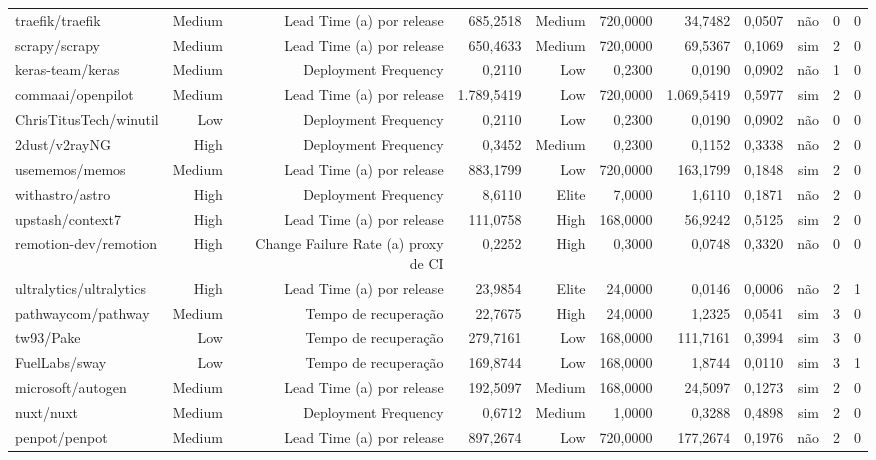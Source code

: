 \begin{tabular}{lrrrrrrrrrr}
traefik/traefik & Medium & Lead Time (a) por release & 685,2518 & Medium & 720,0000 & 34,7482 & 0,0507 & não & 0 & 0 \\
scrapy/scrapy & Medium & Lead Time (a) por release & 650,4633 & Medium & 720,0000 & 69,5367 & 0,1069 & sim & 2 & 0 \\
keras-team/keras & Medium & Deployment Frequency & 0,2110 & Low & 0,2300 & 0,0190 & 0,0902 & não & 1 & 0 \\
commaai/openpilot & Medium & Lead Time (a) por release & 1.789,5419 & Low & 720,0000 & 1.069,5419 & 0,5977 & sim & 2 & 0 \\
ChrisTitusTech/winutil & Low & Deployment Frequency & 0,2110 & Low & 0,2300 & 0,0190 & 0,0902 & não & 0 & 0 \\
2dust/v2rayNG & High & Deployment Frequency & 0,3452 & Medium & 0,2300 & 0,1152 & 0,3338 & não & 2 & 0 \\
usememos/memos & Medium & Lead Time (a) por release & 883,1799 & Low & 720,0000 & 163,1799 & 0,1848 & sim & 2 & 0 \\
withastro/astro & High & Deployment Frequency & 8,6110 & Elite & 7,0000 & 1,6110 & 0,1871 & não & 2 & 0 \\
upstash/context7 & High & Lead Time (a) por release & 111,0758 & High & 168,0000 & 56,9242 & 0,5125 & sim & 2 & 0 \\
remotion-dev/remotion & High & Change Failure Rate (a) proxy de CI & 0,2252 & High & 0,3000 & 0,0748 & 0,3320 & não & 0 & 0 \\
ultralytics/ultralytics & High & Lead Time (a) por release & 23,9854 & Elite & 24,0000 & 0,0146 & 0,0006 & não & 2 & 1 \\
pathwaycom/pathway & Medium & Tempo de recuperação & 22,7675 & High & 24,0000 & 1,2325 & 0,0541 & sim & 3 & 0 \\
tw93/Pake & Low & Tempo de recuperação & 279,7161 & Low & 168,0000 & 111,7161 & 0,3994 & sim & 3 & 0 \\
FuelLabs/sway & Low & Tempo de recuperação & 169,8744 & Low & 168,0000 & 1,8744 & 0,0110 & sim & 3 & 1 \\
microsoft/autogen & Medium & Lead Time (a) por release & 192,5097 & Medium & 168,0000 & 24,5097 & 0,1273 & sim & 2 & 0 \\
nuxt/nuxt & Medium & Deployment Frequency & 0,6712 & Medium & 1,0000 & 0,3288 & 0,4898 & sim & 2 & 0 \\
penpot/penpot & Medium & Lead Time (a) por release & 897,2674 & Low & 720,0000 & 177,2674 & 0,1976 & não & 2 & 0 \\

\end{tabular}
